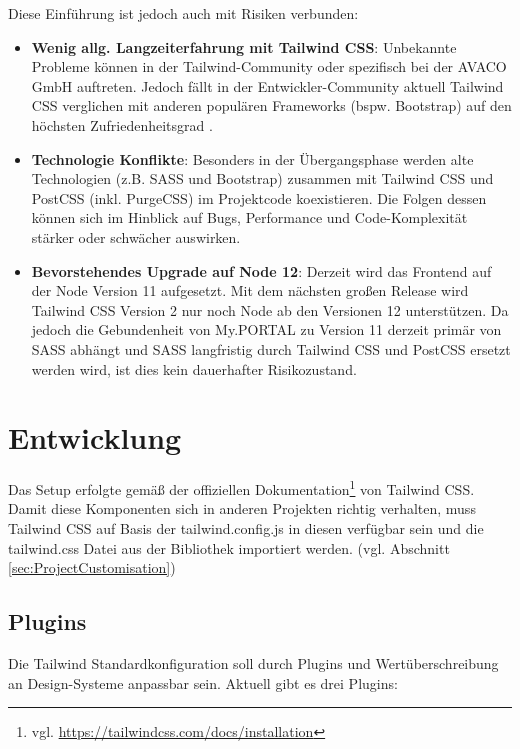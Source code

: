 Diese Einführung ist jedoch auch mit Risiken verbunden:
\begin{itemize}
  \item \textbf{Wenig allg. Langzeiterfahrung mit Tailwind CSS}: Unbekannte Probleme können in der Tailwind-Community oder spezifisch bei der AVACO GmbH auftreten. Jedoch fällt in der Entwickler-Community  aktuell Tailwind CSS verglichen mit anderen populären Frameworks (bspw. Bootstrap) auf den höchsten Zufriedenheitsgrad \citep{StateCSS2019_Frameworks}.
  \item \textbf{Technologie Konflikte}: Besonders in der Übergangsphase werden alte Technologien (z.B. SASS und Bootstrap) zusammen mit Tailwind CSS und PostCSS (inkl. PurgeCSS) im Projektcode koexistieren. Die Folgen dessen können sich im Hinblick auf Bugs, Performance und Code-Komplexität stärker oder schwächer auswirken.
  \item \textbf{Bevorstehendes Upgrade auf Node 12}: Derzeit wird das Frontend auf der Node Version 11 aufgesetzt. Mit dem nächsten großen Release wird Tailwind CSS Version 2 nur noch Node ab den Versionen 12 unterstützen. Da jedoch die Gebundenheit von My.PORTAL zu Version 11 derzeit primär von SASS abhängt und SASS langfristig durch Tailwind CSS und PostCSS ersetzt werden wird, ist dies kein dauerhafter Risikozustand.
\end{itemize}

\section{Entwicklung}
Das Setup erfolgte gemäß der offiziellen Dokumentation\footnote{vgl. \url{https://tailwindcss.com/docs/installation}} von Tailwind CSS. Damit diese Komponenten sich in anderen Projekten richtig verhalten, muss Tailwind CSS auf Basis der tailwind.config.js in diesen verfügbar sein und die tailwind.css Datei aus der Bibliothek importiert werden. (vgl. Abschnitt \ref{sec:ProjectCustomisation})


\subsection{Plugins}
Die Tailwind Standardkonfiguration soll durch Plugins und Wertüberschreibung an Design-Systeme anpassbar sein. Aktuell gibt es drei Plugins:

